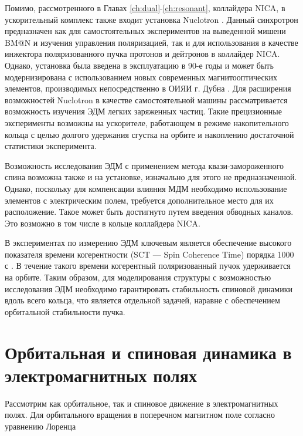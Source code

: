 \par Помимо, рассмотренного в Главах \ref{ch:dual}-\ref{ch:resonant}, коллайдера NICA, в ускорительный комплекс также входит установка Nuclotron \cite{nuclotron24}. Данный синхротрон предназначен как для самостоятельных экспериментов на выведенной мишени BM@N и изучения управления поляризацией, так и для использования в качестве инжектора поляризованного пучка протонов и дейтронов в коллайдер NICA. Однако, установка была введена в эксплуатацию в 90-е годы \cite{baldin:nuclotron} и может быть модернизирована с использованием новых современных магнитооптических элементов, производимых непосредственно в ОИЯИ г. Дубна \cite{korovkin:nica_magnets}. Для расширения возможностей Nuclotron в качестве самостоятельной машины рассматривается возможность изучения ЭДМ легких заряженных частиц. Такие прецизионные эксперименты возможны на ускорителе, работающем в режиме накопительного кольца с целью долгого удержания сгустка на орбите и накоплению достаточной статистики эксперимента. 

\par Возможность исследования ЭДМ с применением метода квази-замороженного спина возможна также и на установке, изначально для этого не предназначенной. Однако, поскольку для компенсации влияния МДМ необходимо использование элементов с электрическим полем, требуется дополнительное место для их расположение. Такое может быть достигнуто путем введения обводных каналов. Это возможно в том числе в кольце коллайдера NICA.

\par В экспериментах по измерению ЭДМ ключевым является обеспечение высокого показателя времени когерентности (SCT — Spin Coherence Time) порядка 1000 с \cite{AGSproposal}. В течение такого времени когерентный поляризованный пучок удерживается на орбите. Таким образом, для моделирования структуры с возможностью исследования ЭДМ необходимо гарантировать стабильность спиновой динамики вдоль всего кольца, что является отдельной задачей, наравне с обеспечением орбитальной стабильности пучка.

\section{Орбитальная и спиновая динамика в электромагнитных полях}\label{sec:EDM/requirements/deflector}

\par Рассмотрим как орбитальное, так и спиновое движение в электромагнитных полях. Для орбитального вращения в поперечном магнитном поле согласно уравнению Лоренца

